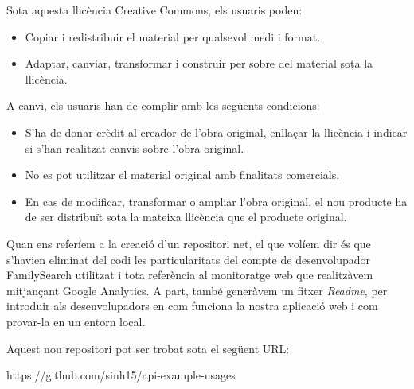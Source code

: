     Sota aquesta llicència Creative Commons, els usuaris poden:

    \begin{itemize}
        \item Copiar i redistribuir el material per qualsevol medi i format.
        \item Adaptar, canviar, transformar i construir per sobre del material sota la llicència.
    \end{itemize}

    A canvi, els usuaris han de complir amb les següents condicions:

    \begin{itemize}
        \item S'ha de donar crèdit al creador de l'obra original, enllaçar la llicència i indicar si s'han realitzat canvis sobre l'obra original.
        \item No es pot utilitzar el material original amb finalitats comercials.
        \item En cas de modificar, transformar o ampliar l'obra original, el nou producte ha de ser distribuït sota la mateixa llicència que el producte original.
    \end{itemize}

    Quan ens referíem a la creació d'un repositori net, el que volíem dir és que s'havien eliminat del codi les particularitats del compte de desenvolupador Family\-Search utilitzat i tota referència al monitoratge web que realitzàvem mitjançant Google Analytics. A part, també generàvem un fitxer \emph{Readme}, per introduir als desenvolupadors en com funciona la nostra aplicació web i com provar-la en un entorn local.

    Aquest nou repositori pot ser trobat sota el següent URL:

    https://github.com/sinh15/api-example-usages
